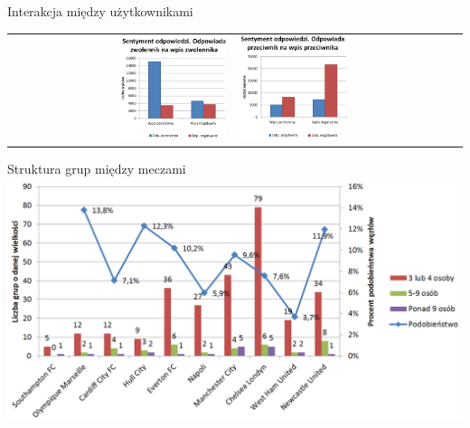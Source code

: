 \documentclass{beamer}
\begin{document}
\begin{frame}{Interakcja między użytkownikami}
\begin{adjustwidth}{-5cm}{-5cm}
\begin{table}
\begin{tabular}{rl}
\includegraphics[width=0.50\textwidth]{img/reply-sentiment-zwolennik-zwolennik.PNG}
&
\includegraphics[width=0.50\textwidth]{img/reply-sentiment-przeciwnik-przeciwnik.PNG}
\end{tabular}
\end{table}
\end{adjustwidth}
\end{frame}






\begin{frame}{Struktura grup między meczami}
\includegraphics[width=1\textwidth]{img/grupy-arsenal-nums.png}
\end{frame}
\end{document}
